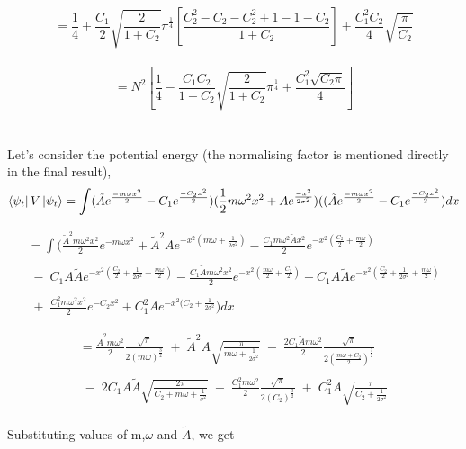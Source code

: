 \documentclass[12pt]{article}
\begin{document}
\[= \frac{1}{4} + \frac{C_1}{2} \sqrt{\frac{2}{1 + C_2}} \pi^\frac{1}{4} [\frac{C_2^2 - C_2 -C_2^2 +1 - 1 - C_2}{1 + C_2}] + \frac{C_1^2 C_2}{4} \sqrt{\frac{\pi}{C_2}} \]
\\
\begin{equation}
  = N^2 [\frac{1}{4} - \frac{C_1 C_2}{1 + C_2}\sqrt{\frac{2}{1 + C_2}} \pi^\frac{1}{4} + \frac{C_1^2 \sqrt{C_2 \pi}}{4} ]
\end{equation}
\\
\\
Let's consider the potential energy (the normalising factor is mentioned directly in the final result), 
\[\bra{\psi_t}V\ket{\psi_t} = \int(\tilde{A}e^{\frac{-m \omega x^2}{2}} - C_1e^{\frac{-C_2 x^2}{2}})(\frac{1}{2}m\omega^2 x^{2} + A e^{\frac{-x^2}{2\sigma^2}}) ((\tilde{A}e^{\frac{-m \omega x^2}{2}} - C_1e^{\frac{-C_2 x^2}{2}}) dx\]

\begin{multline*}
= \int ( \frac{\tilde{A}^2 m \omega^2 x^2}{2} e^{-m\omega x^2} + \tilde{A}^2 A e^{-x^2(m\omega + \frac{1}{2 \sigma^2})} - \frac{C_1 m \omega^2 \tilde{A}x^2}{2} e^{-x^2(\frac{C_2}{2} + \frac{m \omega}{2})} \\
\\
\;-\; C_1 A \tilde{A} e^{-x^2(\frac{C_2}{2} + \frac{1}{2 \sigma^2} + \frac{m \omega}{2})} - \frac{C_1 \tilde{A}m \omega^2 x^2}{2} e^{-x^2 (\frac{m \omega}{2} + \frac{C_2}{2})} - C_1 A \tilde{A} e^{-x^2 (\frac{C_2}{2} + \frac{1}{2 \sigma^2} + \frac{m \omega}{2})} \\
\\
\;+\; \frac{C_1^2 m \omega^2 x^2}{2} e^{-C_2 x^2} + C_1^2 A e^{-x^2(C_2 + \frac{1}{2 \sigma^2}} ) dx 
\end{multline*}
\newpage

\begin{multline*}
= \frac{\tilde{A}^2 m \omega^2}{2} \frac{\sqrt{\pi}}{2 (m\omega)^\frac{3}{2}} \;+\; \tilde{A}^2 A \sqrt{\frac{\pi}{m \omega + \frac{1}{2 \sigma^2}}} \;-\; \frac{2 C_1 \tilde{A} m \omega^2}{2} \frac{\sqrt{\pi}}{2 (\frac{m \omega + C_2}{2})^\frac{3}{2}} \\
\\
\;-\; 2 C_1 A \tilde{A} \sqrt{\frac{2 \pi}{C_2 + m\omega + \frac{1}{\sigma^2}}} \;+\; \frac{C_1^2 m \omega^2}{2} \frac{\sqrt{\pi}}{2 (C_2)^\frac{3}{2}} \;+\; C_1^2 A \sqrt{\frac{\pi}{C_2 + \frac{1}{2 \sigma^2}}}
\end{multline*}
\\
Substituting values of m,$\omega$ and $\tilde{A}$, we get 
\end{document}
